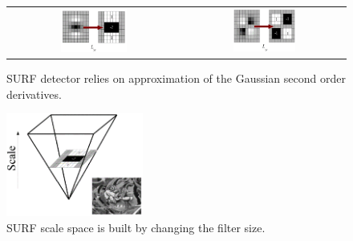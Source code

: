 \begin{figure}[H]
\centering
 \begin{tabular}{cc}
 \includegraphics[width=0.4\textwidth]{figures/surf_lyy} &
 \includegraphics[width=0.4\textwidth]{figures/surf_lxy}
 \end{tabular}
\caption{SURF detector relies on approximation of the Gaussian second order derivatives.}
\label{fig:surf_detector}
\end{figure}

\begin{figure}[H]
\centering
\includegraphics[width=0.4\textwidth]{figures/surf_scale}
\caption{SURF scale space is built by changing the filter size.}
\label{fig:surf_scale}
\end{figure}

